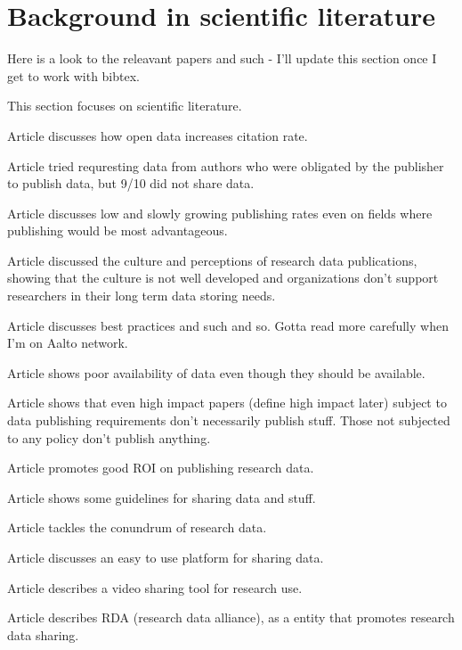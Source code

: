 \chapter{Background in scientific literature}
\label{chapter:background} 

Here is a look to the releavant papers and such - I'll update this section once
I get to work with bibtex.

This section focuses on scientific literature.

Article \cite{piwowar2007sharing} discusses how open data increases citation
rate.

Article \cite{savage2009empirical} tried requresting data from authors who were
obligated by the publisher to publish data, but 9/10 did not share data.

Article \cite{piwowar2011shares} discusses low and slowly growing publishing
rates even on fields where publishing would be most advantageous.

Article \cite{tenopir2011data} discussed the culture and perceptions of
research data publications, showing that the culture is not well developed
and organizations don't support  researchers in their long term data storing
needs.

Article \cite{whitlock2011data} discusses best practices and such and so.
Gotta read more carefully when I'm on Aalto network.

Article \cite{wicherts2006poor} shows poor availability of data even though
they should be available.

Article \cite{alsheikh2011public} shows that even high impact papers (define
high impact later) subject to data publishing requirements don't necessarily
publish stuff. Those not subjected to any policy don't publish anything.

Article \cite{piwowar2011data} promotes good ROI on publishing research data.

Article \cite{hrynaszkiewicz2010preparing} shows some guidelines for sharing
data and stuff.

Article \cite{DBLP:journals/jasis/Borgman12} tackles the conundrum of research
data.

Article \cite{DBLP:conf/isiwi/AlamMS15} discusses an easy to use platform for
sharing data.

Article \cite{DBLP:conf/jcdl/SimonGSG15} describes a video sharing tool for research
use.

Article \cite{DBLP:journals/dlib/BermanWW14} describes RDA (research data
alliance), as a entity that promotes research data sharing.

